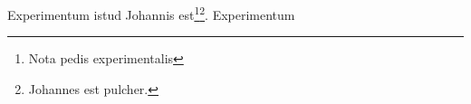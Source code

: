 \documentclass{book}
\begin{document}
Experimentum istud Johannis est\footnote{Nota pedis experimentalis}\footnote{Johannes est pulcher.}.
Experimentum

\newpage
\printindex[res]
\printindex[pers]
\end{document}
